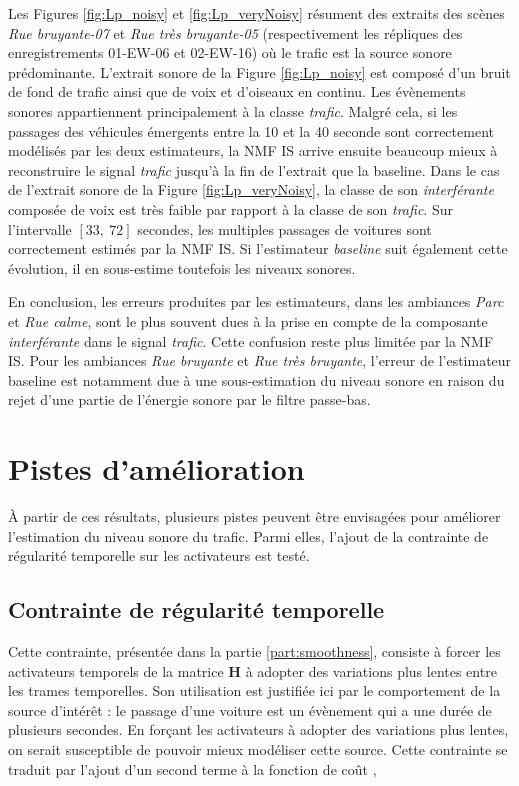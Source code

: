 Les Figures \ref{fig:Lp_noisy} et \ref{fig:Lp_veryNoisy} résument des extraits des scènes \textit{Rue bruyante-07} et \textit{Rue très bruyante-05} (respectivement les répliques des enregistrements 01-EW-06 et 02-EW-16) où le trafic est la source sonore prédominante. L'extrait sonore de la Figure \ref{fig:Lp_noisy} est composé d'un bruit de fond de trafic ainsi que de voix et d'oiseaux en continu. Les évènements sonores appartiennent principalement à la classe \textit{trafic}. Malgré cela, si les passages des véhicules émergents entre la 10\ieme{} et la 40\ieme{} seconde sont correctement modélisés par les deux estimateurs, la NMF IS arrive ensuite beaucoup mieux à reconstruire le signal \textit{trafic} jusqu'à la fin de l'extrait que la baseline. Dans le cas de l'extrait sonore de la Figure \ref{fig:Lp_veryNoisy}, la classe de son \textit{interférante} composée de voix est très faible par rapport à la classe de son \textit{trafic}. Sur l'intervalle $\left[ 33,~72 \right]$ secondes, les multiples passages de voitures sont correctement estimés par la NMF IS. Si l'estimateur \textit{baseline} suit également cette évolution, il en sous-estime toutefois les niveaux sonores.

En conclusion, les erreurs produites par les estimateurs, dans les ambiances \textit{Parc} et \textit{Rue calme}, sont le plus souvent dues à la prise en compte de la composante \textit{interférante} dans le signal \textit{trafic}. Cette confusion reste plus limitée par la NMF IS. Pour les ambiances \textit{Rue bruyante} et \textit{Rue très bruyante}, l'erreur de l'estimateur baseline est notamment due à une sous-estimation du niveau sonore en raison du rejet d'une partie de l'énergie sonore par le filtre passe-bas. 

\section{Pistes d'amélioration}

\`A partir de ces résultats, plusieurs pistes peuvent être envisagées pour améliorer l'estimation du niveau sonore du trafic. Parmi elles, l'ajout de la contrainte de régularité temporelle sur les activateurs est testé.

\subsection{Contrainte de régularité temporelle}\label{chap:nmf_smooth}

Cette contrainte, présentée dans la partie \ref{part:smoothness}, consiste à forcer les activateurs temporels de la matrice $\mathbf{H}$ à adopter des variations plus lentes entre les trames temporelles. Son utilisation est justifiée ici par le comportement de la source d'intérêt : le passage d'une voiture est un évènement qui a une durée de plusieurs secondes. En forçant les activateurs à adopter des variations plus lentes, on serait susceptible de pouvoir mieux modéliser cette source. Cette contrainte se traduit par l'ajout d'un second terme à la fonction de coût \cite{virtanen_monaural_2007}, 

